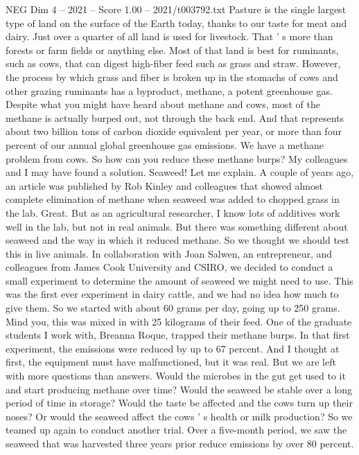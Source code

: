 \begin{textsample}{NEG Dim 4 – 2021 – Score 1.00 – 2021/t003792.txt}  \label{ex:f4_neg_051}
Pasture is the single largest type of land on the surface of the Earth today, thanks to our taste for meat and dairy.
Just over a quarter of all land is used for livestock.
That ' s more than forests or farm fields or anything else.
Most of that land is best for ruminants, such as cows, that can digest high-fiber feed such as grass and straw.
However, the process by which grass and fiber is broken up in the stomachs of cows and other grazing ruminants has a byproduct, methane, a potent greenhouse gas.
Despite what you might have heard about methane and cows, most of the methane is actually burped out, not through the back end.
And that represents about two billion tons of carbon dioxide equivalent per year, or more than four percent of our annual global greenhouse gas emissions.
We have a methane problem from cows.
So how can you reduce these methane burps?
My colleagues and I may have found a solution.
Seaweed!
Let me explain.
A couple of years ago, an article was published by Rob Kinley and colleagues that showed almost complete elimination of methane when seaweed was added to chopped grass in the lab.
Great.
But as an agricultural researcher, I know lots of additives work well in the lab, but not in real animals.
But there was something different about seaweed and the way in which it reduced methane.
So we thought we should test this in live animals.
In collaboration with Joan Salwen, an entrepreneur, and colleagues from James Cook University and CSIRO, we decided to conduct a small experiment to determine the amount of seaweed we might need to use.
This was the first ever experiment in dairy cattle, and we had no idea how much to give them.
So we started with about 60 grams per day, going up to 250 grams.
Mind you, this was mixed in with 25 kilograms of their feed.
One of the graduate students I work with, Breanna Roque, trapped their methane burps.
In that first experiment, the emissions were reduced by up to 67 percent.
And I thought at first, the equipment must have malfunctioned, but it was real.
But we are left with more questions than answers.
Would the microbes in the gut get used to it and start producing methane over time?
Would the seaweed be stable over a long period of time in storage?
Would the taste be affected and the cows turn up their noses?
Or would the seaweed affect the cows ' s health or milk production?
So we teamed up again to conduct another trial.
Over a five-month period, we saw the seaweed that was harvested three years prior reduce emissions by over 80 percent.

\end{textsample}
